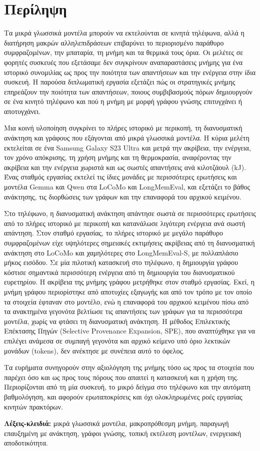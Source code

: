 
\chapter*{Περίληψη}

Τα μικρά γλωσσικά μοντέλα μπορούν να εκτελούνται σε κινητά τηλέφωνα, αλλά η διατήρηση
μακρών αλληλεπιδράσεων επιβαρύνει το περιορισμένο παράθυρο συμφραζομένων, την μπαταρία, τη
μνήμη και τα θερμικά τους όρια. Οι μελέτες σε φορητές συσκευές που εξετάσαμε δεν συγκρίνουν
αναπαραστάσεις μνήμης για ένα ιστορικό συνομιλίας ως προς την ποιότητα των απαντήσεων και την
ενέργεια στην ίδια συσκευή. Η παρούσα διπλωματική εργασία εξετάζει πώς οι στρατηγικές
μνήμης επηρεάζουν την ποιότητα των απαντήσεων, ποιους συμβιβασμούς πόρων δημιουργούν σε ένα
κινητό τηλέφωνο και πού η μνήμη με μορφή γράφου γνώσης επιτυγχάνει ή αποτυγχάνει.

Μια κοινή υλοποίηση συγκρίνει το πλήρες ιστορικό με περικοπή, τη διανυσματική ανάκτηση και
γράφους που εξάγονται από μικρά γλωσσικά μοντέλα. Η κύρια μελέτη εκτελείται σε ένα Samsung
Galaxy S23 Ultra και μετρά την ακρίβεια, την ενέργεια, τον χρόνο απόκρισης, τη χρήση μνήμης
και τη θερμοκρασία, αναφέροντας την ακρίβεια και την ενέργεια χωριστά και ως σωστές
απαντήσεις ανά κιλοτζάουλ (kJ). Ένας σταθμός εργασίας εκτελεί τις ίδιες μονάδες με
περισσότερες ερωτήσεις και μοντέλα Gemma και Qwen στα LoCoMo και LongMemEval, και εξετάζει το βάθος ανάκτησης, τις διορθώσεις των
γράφων και την επαναφορά του αρχικού κειμένου.

Στο τηλέφωνο, η διανυσματική ανάκτηση απάντησε σωστά σε περισσότερες ερωτήσεις από το πλήρες
ιστορικό με περικοπή και κατανάλωσε λιγότερη ενέργεια ανά σωστή απάντηση. Στον σταθμό
εργασίας, το πλήρες ιστορικό με μεγάλο παράθυρο συμφραζομένων είχε υψηλότερες σημειακές
εκτιμήσεις ακρίβειας από τη διανυσματική ανάκτηση στο LoCoMo και χαμηλότερες στο LongMemEval-S,
με πολλαπλάσιο μήκος εισόδου. Σε μία πιλοτική
κατασκευή στο τηλέφωνο, η δημιουργία γράφου κόστισε σημαντικά περισσότερη ενέργεια από τη
δημιουργία του διανυσματικού ευρετηρίου. Η ακρίβεια της μνήμης γράφου μετρήθηκε στον
σταθμό εργασίας. Εκεί, η μνήμη γράφου περιορίστηκε από αποτυχίες εξαγωγής και από τον τρόπο με
τον οποίο τα στοιχεία έφταναν στο μοντέλο, ενώ η επαναφορά του αρχικού κειμένου πίσω από τα
ανακτημένα γεγονότα βελτίωσε τις απαντήσεις των γράφων για τα περισσότερα μοντέλα, χωρίς να
φτάσει τη διανυσματική ανάκτηση. Η μέθοδος Επιλεκτικής Επέκτασης Πηγών (Selective
Provenance Expansion, SPE), που αναπτύχθηκε για να επιλέγει ανάμεσα σε συμπαγή γεγονότα και
αρχικό κείμενο υπό όριο λεκτικών μονάδων (tokens), δεν ανέκτησε με συνέπεια αυτό το όφελος.

Τα ευρήματα συνηγορούν στην αξιολόγηση της μνήμης τόσο ως προς τα στοιχεία που παρέχει όσο
και ως προς τους πόρους που απαιτεί η κατασκευή και η χρήση της. Περιορίζονται από τη μία
συσκευή, το μικρό δείγμα στο τηλέφωνο και την αυτόματη βαθμολόγηση, και αφορούν
ερωταποκρίσεις και όχι ολοκληρωμένες ροές εργασίας κινητών πρακτόρων.

\medskip
\noindent\textbf{Λέξεις-κλειδιά:} μικρά γλωσσικά μοντέλα, μακροπρόθεσμη μνήμη,
παραγωγή επαυξημένη με ανάκτηση, γράφοι γνώσης, τοπική εκτέλεση μοντέλων,
ενεργειακή αποδοτικότητα.
